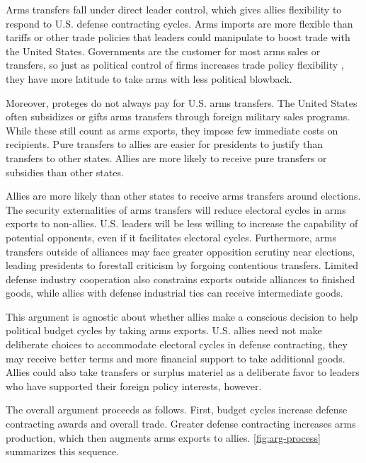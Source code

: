 \documentclass[12pt]{article}
\begin{document}
Arms transfers fall under direct leader control, which gives allies flexibility to respond to U.S. defense contracting cycles.
Arms imports are more flexible than tariffs or other trade policies that leaders could manipulate to boost trade with the United States.
Governments are the customer for most arms sales or transfers, so just as political control of firms increases trade policy flexibility \citep{Davisetal2019}, they have more latitude to take arms with less political blowback.


Moreover, proteges do not always pay for U.S. arms transfers.
The United States often subsidizes or gifts arms transfers through foreign military sales programs. 
While these still count as arms exports, they impose few immediate costs on recipients.
Pure transfers to allies are easier for presidents to justify than transfers to other states.
Allies are more likely to receive pure transfers or subsidies than other states.

Allies are more likely than other states to receive arms transfers around elections.
The security externalities of arms transfers will reduce electoral cycles in arms exports to non-allies. 
U.S. leaders will be less willing to increase the capability of potential opponents, even if it facilitates electoral cycles.
Furthermore, arms transfers outside of alliances may face greater opposition scrutiny near elections, leading presidents to forestall criticism by forgoing contentious transfers.
Limited defense industry cooperation also constrains exports outside alliances to finished goods, while allies with defense industrial ties can receive intermediate goods.


This argument is agnostic about whether allies make a conscious decision to help political budget cycles by taking arms exports.
U.S. allies need not make deliberate choices to accommodate electoral cycles in defense contracting, they may receive better terms and more financial support to take additional goods. 
Allies could also take transfers or surplus materiel as a deliberate favor to leaders who have supported their foreign policy interests, however. 


The overall argument proceeds as follows.
First, budget cycles increase defense contracting awards and overall trade. 
Greater defense contracting increases arms production, which then augments arms exports to allies.
\autoref{fig:arg-process} summarizes this sequence.
\end{document}
